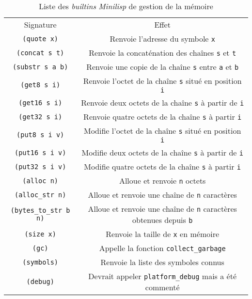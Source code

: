 \documentclass[a4paper, 10pt, french]{article}
\newcommand{\codeC}[1]{\texttt{#1}}
\newcommand{\codeLisp}[1]{\texttt{#1}}
\newcommand{\foreign}[1]{\emph{#1}}
\begin{document}
\begin{table}[H]
  \centering
  \begin{tabularx}{\linewidth}{|C|C|}
    \hline
    Signature & Effet \tabularnewline
    \hhline{|=|=|}
    \codeLisp{(quote x)} & Renvoie l'adresse du symbole \codeLisp{x} \tabularnewline
    \hline
    \codeLisp{(concat s t)} & Renvoie la concaténation des chaînes \codeLisp{s} et \codeLisp{t} \tabularnewline
    \hline
    \codeLisp{(substr s a b)} & Renvoie une copie de la chaîne \codeLisp{s} entre \codeLisp{a} et \codeLisp{b} \tabularnewline
    \hhline{|=|=|}
    \codeLisp{(get8 s i)} & Renvoie l'octet de la chaîne \codeLisp{s} situé en position \codeLisp{i} \tabularnewline
    \hline
    \codeLisp{(get16 s i)} & Renvoie deux octets de la chaîne \codeLisp{s} à partir de \codeLisp{i} \tabularnewline
    \hline
    \codeLisp{(get32 s i)} & Renvoie quatre octets de la chaîne \codeLisp{s} à partir \codeLisp{i} \tabularnewline
    \hline
    \codeLisp{(put8 s i v)} & Modifie l'octet de la chaîne \codeLisp{s} situé en position \codeLisp{i} \tabularnewline
    \hline
    \codeLisp{(put16 s i v)} & Modifie deux octets de la chaîne \codeLisp{s} à partir de \codeLisp{i} \tabularnewline
    \hline
    \codeLisp{(put32 s i v)} & Modifie quatre octets de la chaîne \codeLisp{s} à partir \codeLisp{i} \tabularnewline
    \hhline{|=|=|}
    \codeLisp{(alloc n)} & Alloue et renvoie \codeLisp{n} octets \tabularnewline
    \hline
    \codeLisp{(alloc_str n)} & Alloue et renvoie une chaîne de \codeLisp{n} caractères \tabularnewline
    \hline
    \codeLisp{(bytes_to_str b n)} & Alloue et renvoie une chaîne de \codeLisp{n} caractères obtenues depuis \codeLisp{b} \tabularnewline
    \hhline{|=|=|}
    \codeLisp{(size x)} & Renvoie la taille de \codeLisp{x} en mémoire \tabularnewline
    \hline
    \codeLisp{(gc)} & Appelle la fonction \codeC{collect_garbage} \tabularnewline
    \hline
    \codeLisp{(symbols)} & Renvoie la liste des symboles connus \tabularnewline
    \hline
    \codeLisp{(debug)} & Devrait appeler \codeC{platform_debug} mais a été commenté \tabularnewline
    \hline
  \end{tabularx}
  \caption{Liste des \foreign{builtins} \foreign{Minilisp} de gestion de la mémoire}
\end{table}
\end{document}
